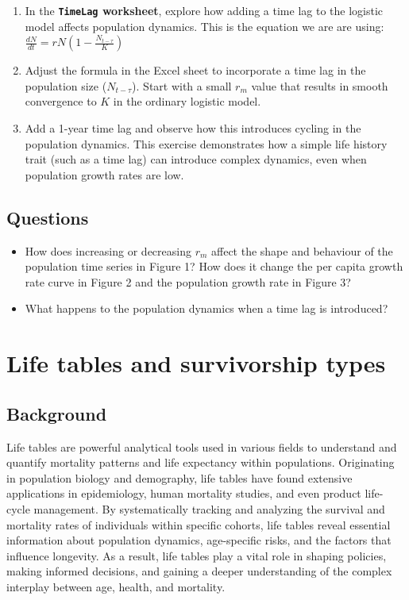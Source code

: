 \documentclass[
  a4paper]{book}
\providecommand{\tightlist}{%
  \setlength{\itemsep}{0pt}\setlength{\parskip}{0pt}}
\begin{document}
\begin{enumerate}
\def\labelenumi{\arabic{enumi}.}
\item
  In the \textbf{\texttt{TimeLag} worksheet}, explore how adding a time lag to the logistic model affects population dynamics. This is the equation we are are using: \(\frac{d N}{d t}=r N\left(1-\frac{N_{t-\tau}}{K}\right)\)
\item
  Adjust the formula in the Excel sheet to incorporate a time lag in the population size (\(N_{t-\tau}\)). Start with a small \(r_m\) value that results in smooth convergence to \(K\) in the ordinary logistic model.
\item
  Add a 1-year time lag and observe how this introduces cycling in the population dynamics. This exercise demonstrates how a simple life history trait (such as a time lag) can introduce complex dynamics, even when population growth rates are low.
\end{enumerate}

\section{Questions}\label{questions-6}

\begin{itemize}
\tightlist
\item
  How does increasing or decreasing \(r_m\) affect the shape and behaviour of the population time series in Figure 1? How does it change the per capita growth rate curve in Figure 2 and the population growth rate in Figure 3?
\end{itemize}

\begin{itemize}
\tightlist
\item
  What happens to the population dynamics when a time lag is introduced?
\end{itemize}

\chapter{Life tables and survivorship types}\label{life-tables-and-survivorship-types}

\section{Background}\label{background-7}

Life tables are powerful analytical tools used in various fields to understand and quantify mortality patterns and life expectancy within populations. Originating in population biology and demography, life tables have found extensive applications in epidemiology, human mortality studies, and even product life-cycle management. By systematically tracking and analyzing the survival and mortality rates of individuals within specific cohorts, life tables reveal essential information about population dynamics, age-specific risks, and the factors that influence longevity. As a result, life tables play a vital role in shaping policies, making informed decisions, and gaining a deeper understanding of the complex interplay between age, health, and mortality.
\end{document}
